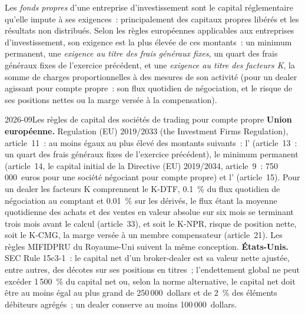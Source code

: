 \begin{definition}\label{def:fm:the-proprietary-market-making-firm:ownfunds}
Les \emph{fonds propres} d'une entreprise d'investissement sont le capital réglementaire qu'elle impute à ses exigences~: principalement des capitaux propres libérés et
les résultats non distribués. Selon les règles européennes applicables aux entreprises d'investissement, son exigence est la plus élevée de ces montants~: un minimum permanent, une \emph{exigence au titre des frais
généraux fixes}, un quart des frais généraux fixes de l'exercice précédent, et une \emph{exigence au titre des
facteurs K}, la somme de charges proportionnelles à des mesures de son activité (pour un dealer agissant pour compte propre~: son flux quotidien
de négociation, et le risque de ses positions nettes ou la marge versée à la compensation).
\end{definition}

\begin{dated}{2026-09}{Les règles de capital des sociétés de trading pour compte propre}\label{dat:fm:the-proprietary-market-making-firm:rules}
\textbf{Union européenne.} Regulation (EU) 2019/2033 (the Investment Firms Regulation), article~11~:  au moins égaux au plus élevé des montants suivants~: l' (article~13~: un quart des frais généraux fixes de l'exercice précédent), le minimum permanent (article~14, le capital initial
de la Directive (EU) 2019/2034, article~9~: 750\,000~euros pour une société négociant pour compte propre) et l' (article~15). Pour un dealer
les facteurs K comprennent le K-DTF, 0.1~\% du flux quotidien de négociation au comptant et 0.01~\% sur les dérivés, le flux étant la moyenne quotidienne des
achats et des ventes en valeur absolue sur six mois se terminant trois mois avant le calcul (article~33), et soit le K-NPR, risque de position nette, soit
le K-CMG, la marge versée à un membre compensateur (article~21). Les règles MIFIDPRU du Royaume-Uni suivent la même conception.
\textbf{États-Unis.} SEC Rule 15c3-1~: le capital net d'un broker-dealer est sa valeur nette ajustée, entre autres, des décotes sur ses positions en
titres~; l'endettement global ne peut excéder 1\,500~\% du capital net ou, selon la norme alternative, le capital net doit être au moins égal au plus grand
de 250\,000~dollars et de 2~\% des éléments débiteurs agrégés~; un dealer conserve au moins 100\,000~dollars.
\end{dated}

